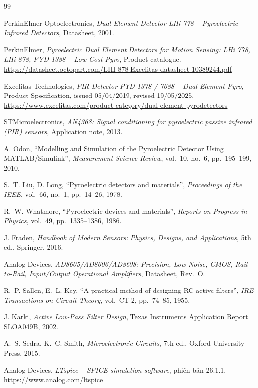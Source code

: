 \begin{thebibliography}{99}
\setlength{\itemsep}{2pt}

 PerkinElmer Optoelectronics, \emph{Dual Element Detector LHi 778 -- Pyroelectric Infrared Detectors}, Datasheet, 2001.

 PerkinElmer, \emph{Pyroelectric Dual Element Detectors for Motion Sensing: LHi 778, LHi 878, PYD 1388 -- Low Cost Pyro}, Product catalogue. \url{https://datasheet.octopart.com/LHI-878-Excelitas-datasheet-10389244.pdf}

 Excelitas Technologies, \emph{PIR Detector PYD 1378 / 7688 -- Dual Element Pyro}, Product Specification, issued 05/04/2019, revised 19/05/2025. \url{https://www.excelitas.com/product-category/dual-element-pyrodetectors}

 STMicroelectronics, \emph{AN4368: Signal conditioning for pyroelectric passive infrared (PIR) sensors}, Application note, 2013.

 A. Odon, ``Modelling and Simulation of the Pyroelectric Detector Using MATLAB/Simulink'', \emph{Measurement Science Review}, vol.~10, no.~6, pp.~195--199, 2010.

 S.~T. Liu, D. Long, ``Pyroelectric detectors and materials'', \emph{Proceedings of the IEEE}, vol.~66, no.~1, pp.~14--26, 1978.

 R.~W. Whatmore, ``Pyroelectric devices and materials'', \emph{Reports on Progress in Physics}, vol.~49, pp.~1335--1386, 1986.

 J. Fraden, \emph{Handbook of Modern Sensors: Physics, Designs, and Applications}, 5th ed., Springer, 2016.

 Analog Devices, \emph{AD8605/AD8606/AD8608: Precision, Low Noise, CMOS, Rail-to-Rail, Input/Output Operational Amplifiers}, Datasheet, Rev.~O.

 R.~P. Sallen, E.~L. Key, ``A practical method of designing RC active filters'', \emph{IRE Transactions on Circuit Theory}, vol.~CT-2, pp.~74--85, 1955.

 J. Karki, \emph{Active Low-Pass Filter Design}, Texas Instruments Application Report SLOA049B, 2002.

 A.~S. Sedra, K.~C. Smith, \emph{Microelectronic Circuits}, 7th ed., Oxford University Press, 2015.

 Analog Devices, \emph{LTspice -- SPICE simulation software}, phiên bản 26.1.1. \url{https://www.analog.com/ltspice}

\end{thebibliography}
